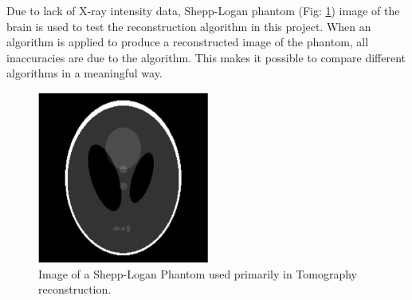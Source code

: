 Due to lack of X-ray intensity data, Shepp-Logan phantom (Fig: \ref{fig:sl}) image of the brain is used to test the reconstruction algorithm in this project. When an algorithm is applied to produce a reconstructed image of the phantom, all inaccuracies are due to the algorithm. This makes it possible to compare different algorithms in a meaningful way.   

\begin{figure}[htbp]
	\centering
		\includegraphics[width=160pt]{Figures/Sl.png}
	\caption[Shepp-Logan Phantom]{Image of a Shepp-Logan Phantom used primarily in Tomography reconstruction.}
	\label{fig:sl}
\end{figure}


%
%

